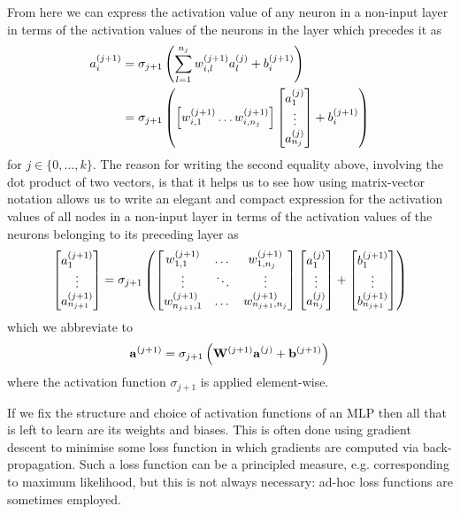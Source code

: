 \documentclass[11pt]{article}
\begin{document}
\noindent From here we can express the activation value of any neuron in a non-input layer in terms of the activation values of the neurons in the layer which precedes it as
\begin{align*}
    a_i^{(j+1)}
    &=
    \sigma_{j+1}\left(
    \sum_{l=1}^{n_j} w_{i,l}^{(j+1)}a_l^{(j)} + b_i^{(j+1)}
    \right)\\
    &=
    \sigma_{j+1}\left(
    \left[w_{i,1}^{(j+1)} \dots w_{i,n_j}^{(j+1)}\right]
    \begin{bmatrix}
        a_1^{(j)}\\
        \vdots\\
        a_{n_j}^{(j)}
    \end{bmatrix}
    +
    b_i^{(j+1)}
\right)
\end{align*}
for $j\in\{0,\dots,k\}$. The reason for writing the second equality above, involving the dot product of two vectors, is that it helps us to see how using matrix-vector notation allows us to write an elegant and compact expression for the activation values of all nodes in a non-input layer in terms of the activation values of the neurons belonging to its preceding layer as
$$
\begin{bmatrix}
    a_1^{(j+1)}\\
    \vdots\\
    a_{n_{j+1}}^{(j+1)}
\end{bmatrix}
=
\sigma_{j+1}\left(
\begin{bmatrix}
    w_{1,1}^{(j+1)} & \dots & w_{1,n_j}^{(j+1)}\\
    \vdots & \ddots & \vdots\\
    w_{n_{j+1},1}^{(j+1)} & \dots & w_{n_{j+1},n_j}^{(j+1)}
\end{bmatrix}
\begin{bmatrix}
    a_1^{(j)}\\
    \vdots\\
    a_{n_j}^{(j)}
\end{bmatrix}
+
\begin{bmatrix}
    b_1^{(j+1)}\\
    \vdots\\
    b_{n_{j+1}}^{(j+1)}
\end{bmatrix}
\right)
$$
which we abbreviate to
$$
\mathbf{a}^{(j+1)}=\sigma_{j+1}\left(\mathbf{W}^{(j+1)}\mathbf{a}^{(j)}+\mathbf{b}^{(j+1)}\right)
$$
where the activation function $\sigma_{j+1}$ is applied element-wise.

If we fix the structure and choice of activation functions of an MLP then all that is left to learn are its weights and biases. This is often done using gradient descent to minimise some loss function in which gradients are computed via back-propagation. Such a loss function can be a principled measure, e.g. corresponding to maximum likelihood, but this is not always necessary: ad-hoc loss functions are sometimes employed.
\end{document}
